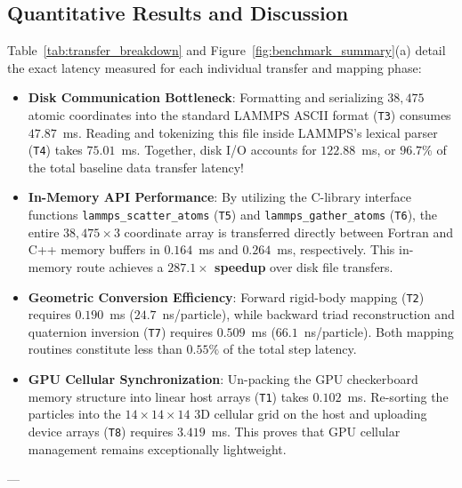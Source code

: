 \documentclass[11pt,a4paper]{article}
\begin{document}
\subsection{Quantitative Results and Discussion}

Table~\ref{tab:transfer_breakdown} and Figure~\ref{fig:benchmark_summary}(a) detail the exact latency measured for each individual transfer and mapping phase:
\begin{itemize}
    \item \textbf{Disk Communication Bottleneck}: Formatting and serializing $38{,}475$ atomic coordinates into the standard LAMMPS ASCII format (\texttt{T3}) consumes $47.87$~ms. Reading and tokenizing this file inside LAMMPS's lexical parser (\texttt{T4}) takes $75.01$~ms. Together, disk I/O accounts for $122.88$~ms, or \textbf{$96.7\%$} of the total baseline data transfer latency!
    \item \textbf{In-Memory API Performance}: By utilizing the C-library interface functions \texttt{lammps\_}\allowbreak\texttt{scatter\_}\allowbreak\texttt{atoms} (\texttt{T5}) and \texttt{lammps\_}\allowbreak\texttt{gather\_}\allowbreak\texttt{atoms} (\texttt{T6}), the entire $38{,}475 \times 3$ coordinate array is transferred directly between Fortran and C++ memory buffers in $0.164$~ms and $0.264$~ms, respectively. This in-memory route achieves a \textbf{$287.1\times$ speedup} over disk file transfers.
    \item \textbf{Geometric Conversion Efficiency}: Forward rigid-body mapping (\texttt{T2}) requires $0.190$~ms ($24.7$~ns/particle), while backward triad reconstruction and quaternion inversion (\texttt{T7}) requires $0.509$~ms ($66.1$~ns/particle). Both mapping routines constitute less than $0.55\%$ of the total step latency.
    \item \textbf{GPU Cellular Synchronization}: Un-packing the GPU checkerboard memory structure into linear host arrays (\texttt{T1}) takes $0.102$~ms. Re-sorting the particles into the $14 \times 14 \times 14$ 3D cellular grid on the host and uploading device arrays (\texttt{T8}) requires $3.419$~ms. This proves that GPU cellular management remains exceptionally lightweight.
\end{itemize}

---
\end{document}
